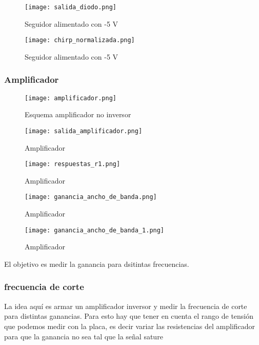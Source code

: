 \documentclass[a4paper, 11pt]{article}
\begin{document}
\begin{figure} [H]
\centering
\texttt{[image: salida\_diodo.png]}
\caption{ Seguidor alimentado con -5 V\label{fig:salida_diodo}}
\end{figure} 

\begin{figure} [H]
\centering
\texttt{[image: chirp\_normalizada.png]}
\caption{ Seguidor alimentado con -5 V\label{fig:chirp_normalizada}}
\end{figure} 


\subsubsection*{Amplificador}

\begin{figure} [H]
\centering
\texttt{[image: amplificador.png]}
\caption{ Esquema amplificador no inversor\label{fig:amplificador}}
\end{figure} 


\begin{figure} [H]
\centering
\texttt{[image: salida\_amplificador.png]}
\caption{ Amplificador\label{fig:salida_amplificador}}
\end{figure} 

\begin{figure} [H]
\centering
\texttt{[image: respuestas\_r1.png]}
\caption{ Amplificador\label{fig:respuestas_r1}}
\end{figure} 

\begin{figure} [H]
\centering
\texttt{[image: ganancia\_ancho\_de\_banda.png]}
\caption{ Amplificador\label{fig:ganancia_ancho_de_banda}}
\end{figure} 

\begin{figure} [H]
\centering
\texttt{[image: ganancia\_ancho\_de\_banda\_1.png]}
\caption{ Amplificador\label{fig:ganancia_ancho_de_banda_1}}
\end{figure} 


El objetivo es medir la ganancia para dsitintas frecuencias. 
\subsubsection*{frecuencia de corte}
La idea aquí es armar un amplificador inversor y medir la frecuencia de corte para distintas ganancias. Para esto hay que tener en cuenta el rango de tensión que podemos medir con la placa, es decir variar las resistencias del amplificador para que la ganancia no sea tal que la señal sature
\end{document}

